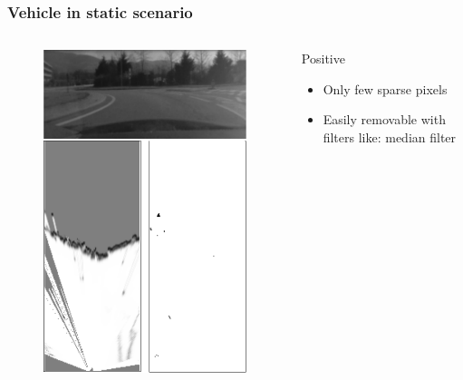 \documentclass{beamer}
\begin{document}
	\begin{frame}
		\frametitle{Vehicle in static scenario}
		
		\begin{columns}[t]
			\begin{column}[t]{5cm}
				\begin{figure}[h]
				\center
				\includegraphics[scale=0.55]{../img/fig:result:scenestatic}
				\end{figure}
			\end{column}
			\begin{column}[t]{5cm}
				\begin{exampleblock}{Positive}
				\begin{itemize}
				\item Only few sparse pixels
				\item Easily removable with filters like: median filter
				\end{itemize}
				\end{exampleblock}		
			\end{column}
		\end{columns}
	\end{frame}			
\end{document}
